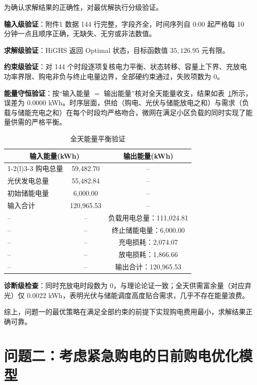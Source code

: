 \documentclass[zihao=-4,a4paper,UTF8,fontset=none]{ctexart}
\begin{document}
为确认求解结果的正确性，对最优解执行分级验证。

\textbf{输入级验证}：附件1 数据 144 行完整，字段齐全，时间序列自 0:00 起严格每 10 分钟一点且顺序正确，无缺失、无穷或非法数值。

\textbf{求解级验证}：HiGHS 返回 Optimal 状态，目标函数值 $35{,}126.95$ 元有限。

\textbf{约束级验证}：对 144 个时段逐项复核电力平衡、状态转移、容量上下界、充放电功率界限、购电非负与终止电量边界，全部硬约束通过，失败项数为 0。

\textbf{能量守恒验证}：按“输入能量 $=$ 输出能量”核对全天能量收支，结果如表~\ref{tab:energy}所示，误差为 $0.0000$ kWh。时序层面，供给（购电、光伏与储能放电之和）与需求（负载与储能充电之和）在每个时段均严格吻合，微网在满足小区负载的同时实现了能量供需的严格平衡。

\begin{table}[H]
  \centering
  \caption{全天能量平衡验证}
  \label{tab:energy}
  \begin{tabular}{lcc}
    \toprule
    \multicolumn{2}{c}{输入能量(kWh)} & \multicolumn{1}{c}{输出能量(kWh)} \\
    \cmidrule(r){1-2}\cmidrule(l){3-3}
    购电总量 & 59,482.70 & -- \\
    光伏发电总量 & 55,482.84 & -- \\
    初始储能电量 & 6,000.00 & -- \\
    \midrule
    输入合计 & 120,965.53 & -- \\
    \midrule
    -- & -- & 负载用电总量：111,024.81 \\
    -- & -- & 终止储能电量：6,000.00 \\
    -- & -- & 充电损耗：2,074.07 \\
    -- & -- & 放电损耗：1,866.66 \\
    \midrule
    -- & -- & 输出合计：120,965.53 \\
    \bottomrule
  \end{tabular}
\end{table}

\textbf{诊断级检查}：同时充放电时段数为 0，与理论论证一致；全天供需富余量（对应弃光）仅 $0.0022$ kWh，表明光伏与储能调度高度贴合需求，几乎不存在能量浪费。

综上，问题一的最优策略在满足全部约束的前提下实现购电费用最小，求解结果正确可靠。

\section{问题二：考虑紧急购电的日前购电优化模型}
\end{document}
